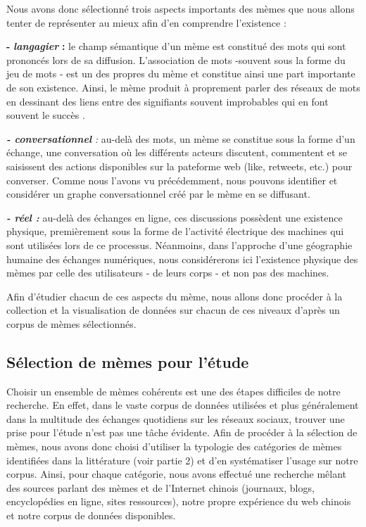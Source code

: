 Nous avons donc s\'electionn\'e trois aspects importants des m\`emes que
nous allons tenter de repr\'esenter au mieux afin d{\textquoteright}en
comprendre l{\textquoteright}existence :

\textbf{{}- }\textbf{\textit{langagier }}\textbf{:} le champ
s\'emantique d{\textquoteright}un m\`eme est constitu\'e des mots qui
sont prononc\'es lors de sa diffusion. L{\textquoteright}association de
mots -souvent sous la forme du jeu de mots - est un des propres du
m\`eme et constitue ainsi une part importante de son existence. Ainsi,
le m\`eme produit \`a proprement parler des r\'eseaux de mots en
dessinant des liens entre des signifiants souvent improbables qui en
font souvent le succ\`es \cite{Bauckhage2011}.

\textbf{\textit{{}- conversationnel }}\textit{: }au-del\`a des mots, un
m\`eme se constitue sous la forme d{\textquoteright}un \'echange, une
conversation o\`u les diff\'erents acteurs discutent, commentent et se
saisissent des actions disponibles sur la pateforme web (like,
retweets, etc.) pour converser. Comme nous l{\textquoteright}avons vu
pr\'ec\'edemment, nous pouvons identifier et consid\'erer un graphe
conversationnel cr\'e\'e par le m\`eme en se diffusant.

\textbf{\textit{{}- r\'eel : }}au-del\`a des \'echanges en ligne, ces
discussions poss\`edent une existence physique, premi\`erement sous la
forme de l{\textquoteright}activit\'e \'electrique des machines qui
sont utilis\'ees lors de ce processus. N\'eanmoins, dans
l{\textquoteright}approche d{\textquoteright}une g\'eographie humaine
des \'echanges num\'eriques, nous consid\'ererons ici
l{\textquoteright}existence physique des m\`emes par celle des
utilisateurs - de leurs corps - et non pas des machines.

Afin d{\textquoteright}\'etudier chacun de ces aspects du m\`eme, nous
allons donc proc\'eder \`a la collection et la visualisation de
donn\'ees sur chacun de ces niveaux d{\textquoteright}apr\`es un corpus
de m\`emes s\'electionn\'es.

\subsection[S\'election de m\`emes pour l{\textquoteright}\'etude]{\textmd{\textup{ S\'election de
m\`emes pour l{\textquoteright}\'etude}}}
Choisir un ensemble de m\`emes coh\'erents est une des \'etapes
difficiles de notre recherche. En effet, dans le vaste corpus de
donn\'ees utilis\'ees et plus g\'en\'eralement dans la multitude des
\'echanges quotidiens sur les r\'eseaux sociaux, trouver une prise pour
l{\textquoteright}\'etude n{\textquoteright}est pas une t\^ache
\'evidente. Afin de proc\'eder \`a la s\'election de m\`emes, nous
avons donc choisi d{\textquoteright}utiliser la typologie des
cat\'egories de m\`emes identifi\'ees dans la litt\'erature (voir
partie 2) et d{\textquoteright}en syst\'ematiser
l{\textquoteright}usage sur notre corpus. Ainsi, pour chaque
cat\'egorie, nous avons effectu\'e une recherche m\^elant des sources
parlant des m\`emes et de l{\textquoteright}Internet chinois (journaux,
blogs, encyclop\'edies en ligne, sites ressources), notre propre
exp\'erience du web chinois et notre corpus de donn\'ees disponibles.

